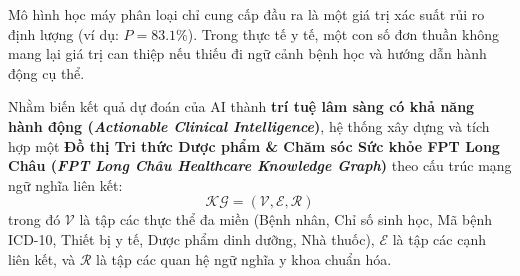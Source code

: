 \documentclass[12pt,a4paper]{report}
\begin{document}
Mô hình học máy phân loại chỉ cung cấp đầu ra là một giá trị xác suất rủi ro định lượng (ví dụ: $P=83.1\%$). Trong thực tế y tế, một con số đơn thuần không mang lại giá trị can thiệp nếu thiếu đi ngữ cảnh bệnh học và hướng dẫn hành động cụ thể. 

Nhằm biến kết quả dự đoán của AI thành \textbf{trí tuệ lâm sàng có khả năng hành động (\textit{Actionable Clinical Intelligence})}, hệ thống xây dựng và tích hợp một \textbf{Đồ thị Tri thức Dược phẩm \& Chăm sóc Sức khỏe FPT Long Châu (\textit{FPT Long Châu Healthcare Knowledge Graph})} theo cấu trúc mạng ngữ nghĩa liên kết:
\begin{equation}
\mathcal{KG} = (\mathcal{V}, \mathcal{E}, \mathcal{R})
\end{equation}
trong đó $\mathcal{V}$ là tập các thực thể đa miền (Bệnh nhân, Chỉ số sinh học, Mã bệnh ICD-10, Thiết bị y tế, Dược phẩm dinh dưỡng, Nhà thuốc), $\mathcal{E}$ là tập các cạnh liên kết, và $\mathcal{R}$ là tập các quan hệ ngữ nghĩa y khoa chuẩn hóa.
\end{document}
